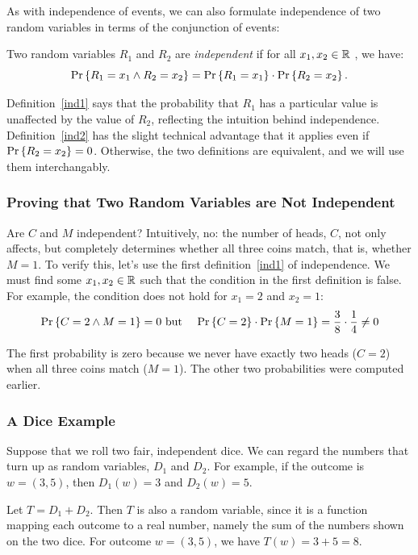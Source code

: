 \documentclass[11pt,twoside]{article}
\begin{document}
As with independence of events, we can also formulate independence of two
random variables in terms of the conjunction of events:
\begin{definition}\label{ind2}
Two random variables $R_1$ and $R_2$ are \emph{independent} if for all
$x_1, x_2 \in \mathbb{R}$ , we have:
\[
\mathop{\textup{Pr}}\nolimits\left\{R_1 = x_1 \land R_2 = x_2\right\} = \mathop{\textup{Pr}}\nolimits\left\{R_1 = x_1\right\} \cdot \mathop{\textup{Pr}}\nolimits\left\{R_2 = x_2\right\}.
\]
\end{definition}

Definition~\ref{ind1} says that the probability that $R_1$ has a
particular value is unaffected by the value of $R_2$, reflecting the
intuition behind independence.  Definition~\ref{ind2} has the slight
technical advantage that it applies even if $\mathop{\textup{Pr}}\nolimits\left\{R_2 = x_2\right\} = 0$.
Otherwise, the two definitions are equivalent, and we will use them
interchangably.

\subsubsection{Proving that Two Random Variables are Not Independent}

Are $C$ and $M$ independent?  Intuitively, no: the number of heads, $C$,
not only affects, but completely determines whether all three coins match,
that is, whether $M = 1$.  To verify this, let's use the first
definition~\ref{ind1} of independence.  We must find some $x_1, x_2 \in
\mathbb{R}$ such that the condition in the first definition is false.  For
example, the condition does not hold for $x_1 = 2$ and $x_2 = 1$:
\begin{eqnarray*}
\mathop{\textup{Pr}}\nolimits\left\{C = 2 \land M = 1\right\} = 0
        & \mbox{ but } &
\mathop{\textup{Pr}}\nolimits\left\{C = 2\right\} \cdot \mathop{\textup{Pr}}\nolimits\left\{M = 1\right\} = \frac{3}{8} \cdot \frac{1}{4} \neq 0
\end{eqnarray*}

The first probability is zero because we never have exactly two heads ($C
= 2$) when all three coins match ($M = 1$).  The other two probabilities
were computed earlier.

\subsubsection{A Dice Example}

Suppose that we roll two fair, independent dice.  We can regard the
numbers that turn up as random variables, $D_1$ and $D_2$.  For
example, if the outcome is $w = (3, 5)$, then $D_1(w) = 3$ and $D_2(w)
= 5$.

Let $T = D_1 + D_2$.  Then $T$ is also a random variable, since it is
a function mapping each outcome to a real number, namely the sum of
the numbers shown on the two dice.  For outcome $w = (3, 5)$, we have
$T(w) = 3 + 5 = 8$.
\end{document}
